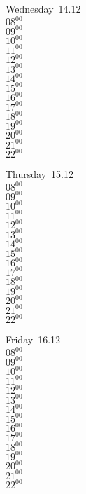 \documentclass[11pt,a4paper]{book}\usepackage[]{graphicx}\usepackage[]{color}
\begin{document}
\begin{weekdaybox}
  Wednesday~14.12\\
  { 
  \vfill
  $08^{00}$\\
$09^{00}$\\
$10^{00}$\\
$11^{00}$\\
$12^{00}$\\
$13^{00}$\\
$14^{00}$\\
$15^{00}$\\
$16^{00}$\\
$17^{00}$\\
$18^{00}$\\
$19^{00}$\\
$20^{00}$\\
$21^{00}$\\
$22^{00}$\\
  }
\end{weekdaybox}
\clearpage
\begin{headerbox}
\end{headerbox}
\begin{weekdaybox}
  Thursday~15.12\\
  { 
  \vfill
  $08^{00}$\\
$09^{00}$\\
$10^{00}$\\
$11^{00}$\\
$12^{00}$\\
$13^{00}$\\
$14^{00}$\\
$15^{00}$\\
$16^{00}$\\
$17^{00}$\\
$18^{00}$\\
$19^{00}$\\
$20^{00}$\\
$21^{00}$\\
$22^{00}$\\
  }
\end{weekdaybox} 
\begin{weekdaybox}
  Friday~16.12\\
  { 
  \vfill
  $08^{00}$\\
$09^{00}$\\
$10^{00}$\\
$11^{00}$\\
$12^{00}$\\
$13^{00}$\\
$14^{00}$\\
$15^{00}$\\
$16^{00}$\\
$17^{00}$\\
$18^{00}$\\
$19^{00}$\\
$20^{00}$\\
$21^{00}$\\
$22^{00}$\\
  }
\end{weekdaybox}
\end{document}
